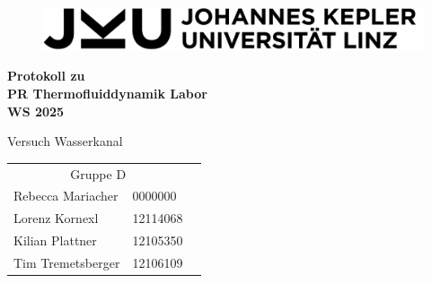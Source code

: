 \begin{titlepage} 
\begin{titlepage} 
    \begin{center}

        \begin{figure}[h]     
            \centering
            \includegraphics[width=14cm]{Fotos/JKU_Logo_2.jpg}
        \end{figure}
        
        \vspace{3cm}
        
        \Large
        \textbf{Protokoll zu\\}
        \Huge
        \textbf{PR Thermofluiddynamik Labor \\ WS 2025\\}

        \vspace{2cm}
        \Huge
        Versuch Wasserkanal\\
        \vspace{5cm}
        
        \begin{table}[h]
        \large
        \centering
        \begin{tabular}{lll}
        \multicolumn{2}{c}{Gruppe D}\\
        Rebecca Mariacher & 0000000 \\
        Lorenz Kornexl &  12114068 \\
        Kilian Plattner & 12105350 \\
        Tim Tremetsberger & 12106109\\
        \end{tabular}
        \end{table}

        \vspace{1.5cm}


     
    \end{center}


\end{titlepage}
\end{titlepage}